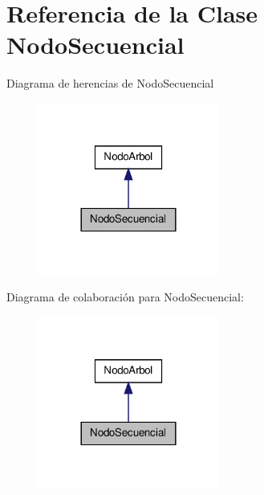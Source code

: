 \hypertarget{class_nodo_secuencial}{\section{\-Referencia de la \-Clase \-Nodo\-Secuencial}
\label{class_nodo_secuencial}
}


\-Diagrama de herencias de \-Nodo\-Secuencial
\nopagebreak
\begin{figure}[H]
\begin{center}
\leavevmode
\includegraphics[width=168pt]{class_nodo_secuencial__inherit__graph}
\end{center}
\end{figure}


\-Diagrama de colaboración para \-Nodo\-Secuencial\-:
\nopagebreak
\begin{figure}[H]
\begin{center}
\leavevmode
\includegraphics[width=168pt]{class_nodo_secuencial__coll__graph}
\end{center}
\end{figure}
